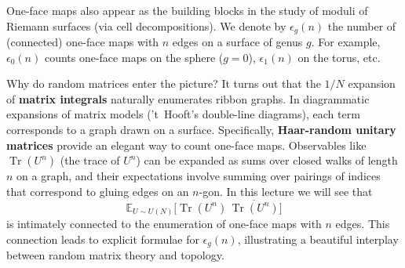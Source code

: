 \documentclass[letterpaper,11pt,oneside,reqno]{article}
\numberwithin{equation}{section}
\theoremstyle{definition}
\begin{document}
One-face maps also appear as the building blocks in the study of moduli of Riemann surfaces (via cell decompositions). We denote by $\epsilon_g(n)$ the number of (connected) one-face maps with $n$ edges on a surface of genus $g$. For example, $\epsilon_0(n)$ counts one-face maps on the sphere ($g=0$), $\epsilon_1(n)$ on the torus, etc.

Why do random matrices enter the picture?  It turns out that the $1/N$ expansion of \textbf{matrix integrals} naturally enumerates ribbon graphs. In diagrammatic expansions of matrix models ('t~Hooft's double-line diagrams), each term corresponds to a graph drawn on a surface. Specifically, \textbf{Haar-random unitary matrices} provide an elegant way to count one-face maps. Observables like $\operatorname{Tr}(U^n)$ (the trace of $U^n$) can be expanded as sums over closed walks of length $n$ on a graph, and their expectations involve summing over pairings of indices that correspond to gluing edges on an $n$-gon. In this lecture we will see that
\[ \mathbb{E}_{U\sim U(N)}\!\Big[\operatorname{Tr}(U^n)\,\overline{\operatorname{Tr}(U^n)}\Big] \]
is intimately connected to the enumeration of one-face maps with $n$ edges. This connection leads to explicit formulae for $\epsilon_g(n)$, illustrating a beautiful interplay between random matrix theory and topology.
\end{document}
